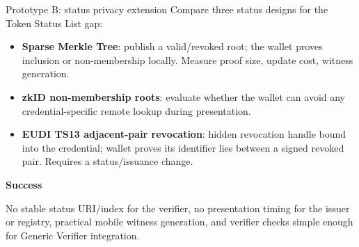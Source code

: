 \documentclass[aspectratio=169]{beamer}
\newcommand{\sourcefoot}{}
\newcommand{\setsources}[1]{\renewcommand{\sourcefoot}{#1}}
\newcommand{\labelhead}[1]{{\small\bfseries\color{zkblue}#1}\par\vspace{0.25em}}
\begin{document}
\setsources{\href{https://github.com/privacy-ethereum/zkID/tree/main/revocation}{zkID revocation}; \href{https://github.com/eu-digital-identity-wallet/eudi-doc-standards-and-technical-specifications/blob/main/docs/technical-specifications/ts13-zksnarks.md}{EUDI TS13}}
\begin{frame}{Prototype B: status privacy extension}
  Compare three status designs for the Token Status List gap:

  \vspace{0.35em}
  \begin{itemize}
    \item \textbf{Sparse Merkle Tree}: publish a valid/revoked root; the wallet
      proves inclusion or non-membership locally. Measure proof size, update
      cost, witness generation.
    \item \textbf{zkID non-membership roots}: evaluate whether the wallet can
      avoid any credential-specific remote lookup during presentation.
    \item \textbf{EUDI TS13 adjacent-pair revocation}: hidden revocation handle
      bound into the credential; wallet proves its identifier lies between a
      signed revoked pair. Requires a status/issuance change.
  \end{itemize}

  \vspace{0.35em}
  \labelhead{Success}
  No stable status URI/index for the verifier, no presentation timing for the
  issuer or registry, practical mobile witness generation, and verifier checks
  simple enough for Generic Verifier integration.
\end{frame}
\end{document}
